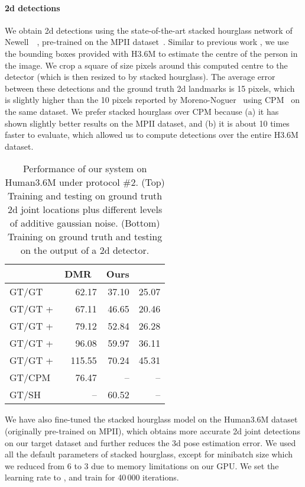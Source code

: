 \documentclass[10pt,twocolumn,letterpaper]{article}
\begin{document}
\paragraph{2d detections} 
We obtain 2d detections using the state-of-the-art stacked hourglass network of Newell~\etal~\cite{stacked-hourglass}, pre-trained on the MPII dataset~\cite{mpii}. Similar to previous work \cite{tekin2016direct, distance-matrix,li2015maximum,h36m,park20163d}, we use the bounding boxes provided with H3.6M to estimate the centre of the person in the image.
We crop a square of size  pixels around this computed centre to the detector (which is then resized to  by stacked hourglass).
The average error between these detections and the ground truth 2d landmarks is 15 pixels, which is slightly higher than the 10 pixels reported by Moreno-Noguer~\cite{distance-matrix} using CPM~\cite{cpm} on the same dataset.
We prefer stacked hourglass over CPM because (a) it has shown slightly better results on the MPII dataset, and (b) it is about 10 times faster to evaluate, which allowed us to compute detections over the entire H3.6M dataset.

\begin{table}
\centering
\begin{tabular}{@{}lrrr@{}}
\toprule
 & DMR~\cite{distance-matrix} & Ours & \\
\midrule
GT/GT                       & 62.17 & 37.10 & 25.07\\
GT/GT +   & 67.11  & 46.65 & 20.46\\
GT/GT +  & 79.12 & 52.84 & 26.28\\
GT/GT +  & 96.08 & 59.97 & 36.11\\
GT/GT +  & 115.55 & 70.24 & 45.31\\
\midrule
GT/CPM~\cite{cpm} & 76.47 & -- & -- \\
GT/SH~\cite{stacked-hourglass}  & -- & 60.52 & --\\
\bottomrule
\end{tabular}
\vspace{3mm}
\caption{Performance of our system on Human3.6M under protocol \#2. (Top) Training and testing on ground truth 2d joint locations plus different levels of additive gaussian noise. (Bottom) Training on ground truth and testing on the output of a 2d detector.}
\label{tab:gt}
\end{table}

We have also fine-tuned the stacked hourglass model on the Human3.6M dataset (originally pre-trained on MPII),
which obtains more accurate 2d joint detections on our target dataset and further reduces the 3d pose estimation error. We used all the default parameters of stacked hourglass, except for minibatch size which we reduced from 6 to 3 due to memory limitations on our GPU. We set the learning rate to , and train for 40\,000 iterations.
\end{document}
